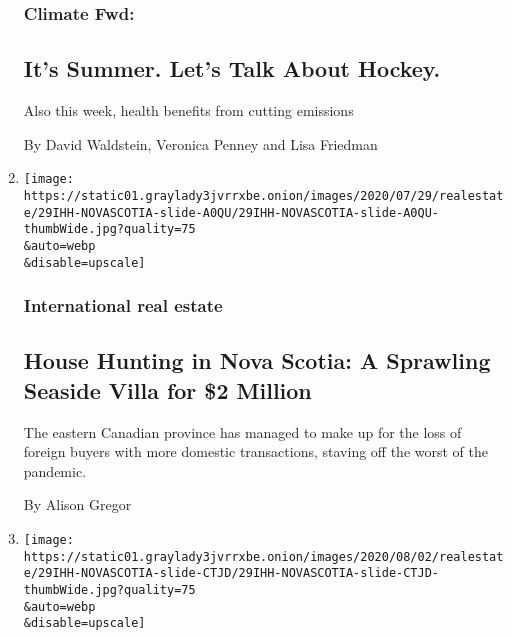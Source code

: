 \begin{enumerate}
  \hypertarget{climate-fwd}{%
  \subsubsection{Climate Fwd:}\label{climate-fwd}}

  \hypertarget{its-summer-lets-talk-about-hockey}{%
  \subsection{It's Summer. Let's Talk About
  Hockey.}\label{its-summer-lets-talk-about-hockey}}

  Also this week, health benefits from cutting emissions

  By David Waldstein, Veronica Penney and Lisa Friedman
\item
  \href{/2020/07/29/realestate/house-hunting-in-nova-scotia-a-sprawling-seaside-villa-for-2-million.html}{}

  \texttt{[image: https://static01.graylady3jvrrxbe.onion/images/2020/07/29/realestate/29IHH-NOVASCOTIA-slide-A0QU/29IHH-NOVASCOTIA-slide-A0QU-thumbWide.jpg?quality=75\\\&auto=webp\\\&disable=upscale]}

  \hypertarget{international-real-estate}{%
  \subsubsection{International real
  estate}\label{international-real-estate}}

  \hypertarget{house-hunting-in-nova-scotia-a-sprawling-seaside-villa-for-2-million}{%
  \subsection{House Hunting in Nova Scotia: A Sprawling Seaside Villa
  for \$2
  Million}\label{house-hunting-in-nova-scotia-a-sprawling-seaside-villa-for-2-million}}

  The eastern Canadian province has managed to make up for the loss of
  foreign buyers with more domestic transactions, staving off the worst
  of the pandemic.

  By Alison Gregor
\item
  \href{/slideshow/2020/07/29/realestate/cape-cod-style-on-the-shores-of-nova-scotia.html}{}

  \texttt{[image: https://static01.graylady3jvrrxbe.onion/images/2020/08/02/realestate/29IHH-NOVASCOTIA-slide-CTJD/29IHH-NOVASCOTIA-slide-CTJD-thumbWide.jpg?quality=75\\\&auto=webp\\\&disable=upscale]}


\end{enumerate}
